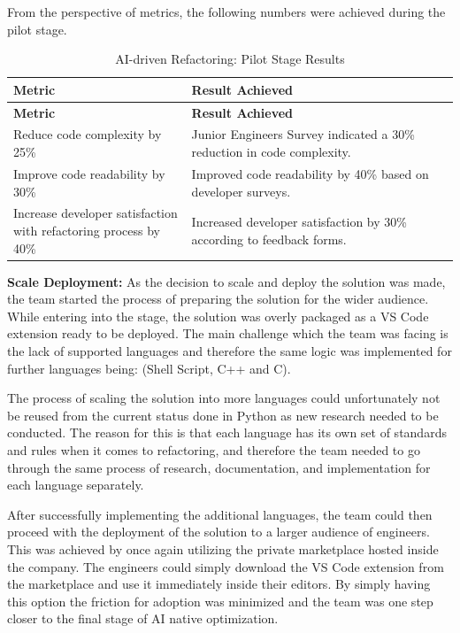 \documentclass[]{imc-inf}
\begin{document}
From the perspective of metrics, the following numbers were achieved during the pilot stage. 
\begin{longtable}{|p{0.4\linewidth}|p{0.6\linewidth}|}
	\hline
	\textbf{Metric} & \textbf{Result Achieved} \\
	\hline
	\endfirsthead
	\hline
	\textbf{Metric} & \textbf{Result Achieved} \\
	\hline
	\endhead
	\hline
	\caption{AI-driven Refactoring: Pilot Stage Results}
	\label{tab:refactor_pilot_results}
	\endlastfoot
	
	Reduce code complexity by 25\% &
	Junior Engineers Survey indicated a 30\% reduction in code complexity. \\
	\hline
	
	Improve code readability by 30\% &
	Improved code readability by 40\% based on developer surveys.\\
	\hline
	
	Increase developer satisfaction with refactoring process by 40\% &
	Increased developer satisfaction by 30\% according to feedback forms. \\
	\hline
\end{longtable}

\textbf{Scale Deployment:}
As the decision to scale and deploy the solution was made, the team started the process of preparing the solution for the wider audience. While entering into the stage, the solution was overly packaged as a VS Code extension ready to be deployed. The main challenge which the team was facing is the lack of supported languages and therefore the same logic was implemented for further languages being: (Shell Script, C++ and C).

The process of scaling the solution into more languages could unfortunately not be reused from the current status done in Python as new research needed to be conducted. The reason for this is that each language has its own set of standards and rules when it comes to refactoring, and therefore the team needed to go through the same process of research, documentation, and implementation for each language separately.

After successfully implementing the additional languages, the team could then proceed with the deployment of the solution to a larger audience of engineers. This was achieved by once again utilizing the private marketplace hosted inside the company. The engineers could simply download the VS Code extension from the marketplace and use it immediately inside their editors. By simply having this option the friction for adoption was minimized and the team was one step closer to the final stage of AI native optimization.
\end{document}
